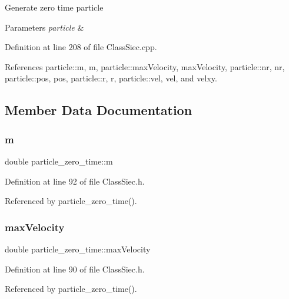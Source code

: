 Generate zero time particle 
\begin{DoxyParams}{Parameters}
{\em particle} & \\
\hline
\end{DoxyParams}


Definition at line 208 of file Class\+Siec.\+cpp.



References particle\+::m, m, particle\+::max\+Velocity, max\+Velocity, particle\+::nr, nr, particle\+::pos, pos, particle\+::r, r, particle\+::vel, vel, and velxy.



\subsection{Member Data Documentation}
\mbox{\label{structparticle__zero__time_ae75f971e47e3bd12789383dd352a2fa6}} 
\subsubsection{\texorpdfstring{m}{m}}
{\footnotesize\ttfamily double particle\+\_\+zero\+\_\+time\+::m}



Definition at line 92 of file Class\+Siec.\+h.



Referenced by particle\+\_\+zero\+\_\+time().

\mbox{\label{structparticle__zero__time_a1162e81c9a3fca1545c7ed2b7a1a6140}} 
\subsubsection{\texorpdfstring{max\+Velocity}{maxVelocity}}
{\footnotesize\ttfamily double particle\+\_\+zero\+\_\+time\+::max\+Velocity}



Definition at line 90 of file Class\+Siec.\+h.



Referenced by particle\+\_\+zero\+\_\+time().

